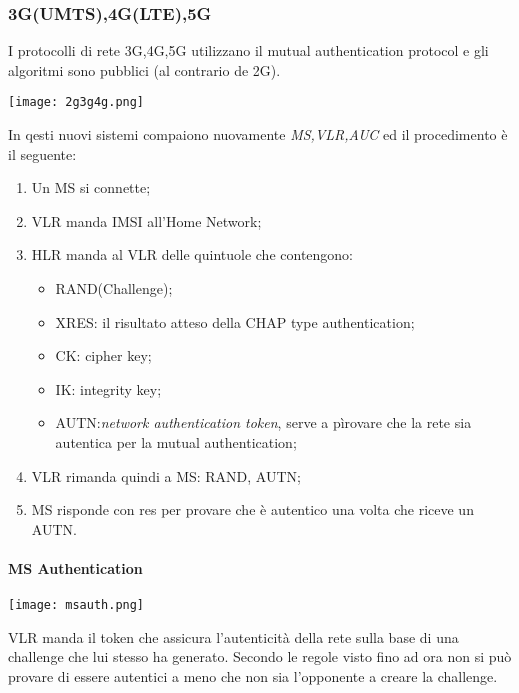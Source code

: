 \documentclass{article}
\theoremstyle{remark}
\begin{document}
\subsubsection{3G(UMTS),4G(LTE),5G}
I protocolli di rete 3G,4G,5G utilizzano il mutual authentication protocol e gli algoritmi sono pubblici (al contrario de 2G).
\begin{center}
	\texttt{[image: 2g3g4g.png]}
\end{center}
In qesti nuovi sistemi compaiono nuovamente \emph{MS,VLR,AUC} ed il procedimento è il seguente:\begin{enumerate}
	\item Un MS si connette;
	\item VLR manda IMSI all'Home Network;
	\item HLR manda al VLR delle quintuole che contengono:\begin{itemize}
		      \item RAND(Challenge);
		      \item XRES: il risultato atteso della CHAP type authentication;
		      \item CK: cipher key;
		      \item IK: integrity key;
		      \item AUTN:\emph{network authentication token}, serve a pìrovare che la rete sia autentica per la mutual authentication;
	      \end{itemize}
	\item VLR rimanda quindi a MS: RAND, AUTN;
	\item MS risponde con res per provare che è autentico una volta che riceve un AUTN.
\end{enumerate}
\paragraph{MS Authentication}
\begin{center}
	\texttt{[image: msauth.png]}
\end{center}
VLR manda il token che assicura l'autenticità della rete sulla base di una challenge che lui stesso ha generato. Secondo le regole visto fino ad ora non si può provare di essere autentici a meno che non sia l'opponente a creare la challenge.
\end{document}
